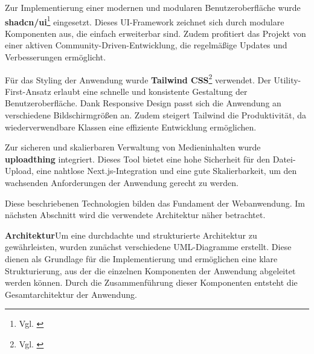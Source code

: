 Zur Implementierung einer modernen und modularen Benutzeroberfläche wurde \textbf{shadcn/ui}\footnote{Vgl. \cite{shadcn_ui_docs}} eingesetzt. Dieses UI-Framework zeichnet sich durch modulare Komponenten 
aus, die einfach erweiterbar sind. Zudem profitiert das Projekt von einer aktiven Community-Driven-Entwicklung, die regelmäßige Updates und Verbesserungen ermöglicht.

Für das Styling der Anwendung wurde \textbf{Tailwind CSS}\footnote{Vgl. \cite{tailwindcss_v2_docs}} verwendet. Der Utility-First-Ansatz erlaubt eine schnelle und konsistente Gestaltung der Benutzeroberfläche. Dank 
Responsive Design passt sich die Anwendung an verschiedene Bildschirmgrößen an. Zudem steigert Tailwind die Produktivität, da wiederverwendbare Klassen eine 
effiziente Entwicklung ermöglichen.

Zur sicheren und skalierbaren Verwaltung von Medieninhalten wurde \textbf{uploadthing} integriert. Dieses Tool bietet eine hohe Sicherheit für den Datei-Upload, eine 
nahtlose Next.js-Integration und eine gute Skalierbarkeit, um den wachsenden Anforderungen der Anwendung gerecht zu werden.

Diese beschriebenen Technologien bilden das Fundament der Webanwendung. Im nächsten Abschnitt wird die verwendete Architektur näher betrachtet.

\textbf{Architektur}\quad Um eine durchdachte und strukturierte Architektur zu gewährleisten, wurden zunächst verschiedene UML-Diagramme erstellt. Diese dienen als 
Grundlage für die Implementierung und ermöglichen eine klare Strukturierung, aus der die einzelnen Komponenten der Anwendung abgeleitet werden können. Durch die 
Zusammenführung dieser Komponenten entsteht die Gesamtarchitektur der Anwendung.

